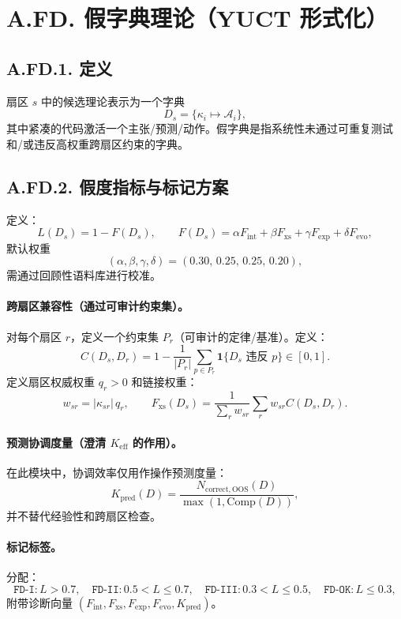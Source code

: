 \documentclass[11pt,a4paper]{article}
\newcommand{\Keff}{K_{\mathrm{eff}}}
\newcommand{\Kpred}{K_{\mathrm{pred}}}
\newcommand{\abs}[1]{\left|#1\right|}
\newcommand{\indicator}{\mathbf{1}}
\begin{document}
	\section*{A.FD. 假字典理论（YUCT 形式化）}
	
	\subsection*{A.FD.1. 定义}
	扇区 $s$ 中的候选理论表示为一个字典
	\[
	D_s=\{\kappa_i\mapsto \mathcal{A}_i\},
	\]
	其中紧凑的代码激活一个主张/预测/动作。假字典是指系统性未通过可重复测试和/或违反高权重跨扇区约束的字典。
	
	\subsection*{A.FD.2. 假度指标与标记方案}
	定义：
	\[
	L(D_s)=1-F(D_s),\qquad
	F(D_s)=\alpha F_{\mathrm{int}}+\beta F_{\mathrm{xs}}+\gamma F_{\mathrm{exp}}+\delta F_{\mathrm{evo}},
	\]
	默认权重
	\[
	(\alpha,\beta,\gamma,\delta)=(0.30,\,0.25,\,0.25,\,0.20),
	\]
	需通过回顾性语料库进行校准。
	
	\paragraph{跨扇区兼容性（通过可审计约束集）。}
	对每个扇区 $r$，定义一个约束集 $P_r$（可审计的定律/基准）。定义：
	\[
	C(D_s,D_r)=1-\frac{1}{|P_r|}\sum_{p\in P_r}\indicator\{D_s\text{ 违反 }p\}\in[0,1].
	\]
	定义扇区权威权重 $q_r>0$ 和链接权重：
	\[
	w_{sr}=\abs{\kappa_{sr}}\,q_r,\qquad
	F_{\mathrm{xs}}(D_s)=\frac{1}{\sum_r w_{sr}}\sum_{r}w_{sr}C(D_s,D_r).
	\]
	
	\paragraph{预测协调度量（澄清 $\Keff$ 的作用）。}
	在此模块中，协调效率仅用作操作预测度量：
	\[
	\Kpred(D)=\frac{N_{\mathrm{correct,OOS}}(D)}{\max(1,\mathrm{Comp}(D))},
	\]
	并不替代经验性和跨扇区检查。
	
	\paragraph{标记标签。}
	分配：
	\[
	\texttt{FD-I}: L>0.7,\quad
	\texttt{FD-II}: 0.5<L\le0.7,\quad
	\texttt{FD-III}: 0.3<L\le0.5,\quad
	\texttt{FD-OK}: L\le0.3,
	\]
	附带诊断向量 $(F_{\mathrm{int}},F_{\mathrm{xs}},F_{\mathrm{exp}},F_{\mathrm{evo}},\Kpred)$。
	
\end{document}
